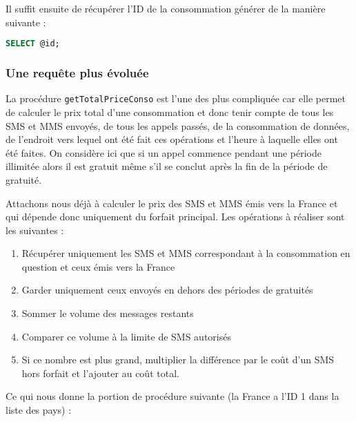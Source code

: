 Il suffit ensuite de récupérer l'ID de la consommation générer de la manière suivante :

\begin{lstlisting}[language=sql]
SELECT @id;
\end{lstlisting}

\subsubsection{Une requête plus évoluée}
La procédure \texttt{getTotalPriceConso} est l'une des plus compliquée car elle permet de calculer le prix total d'une consommation et donc tenir compte de tous les SMS et MMS envoyés, de tous les appels passés, de la consommation de données, de l'endroit vers lequel ont été fait ces opérations et l'heure à laquelle elles ont été faites.
On considère ici que si un appel commence pendant une période illimitée alors il est gratuit même s'il se conclut après la fin de la période de gratuité.

Attachons nous déjà à calculer le prix des SMS et MMS émis vers la France et qui dépende donc uniquement du forfait principal. Les opérations à réaliser sont les suivantes :
\begin{enumerate}[label=\textbf{\thColor{\arabic*}}]
	\item Récupérer uniquement les SMS et MMS correspondant à la consommation en question et ceux émis vers la France
	\item Garder uniquement ceux envoyés en dehors des périodes de gratuités
	\item Sommer le volume des messages restants
	\item Comparer ce volume à la limite de SMS autorisés
	\item Si ce nombre est plus grand, multiplier la différence par le coût d'un SMS hors forfait et l'ajouter au coût total.
\end{enumerate}

Ce qui nous donne la portion de procédure suivante (la France a l'ID 1 dans la liste des pays) :


